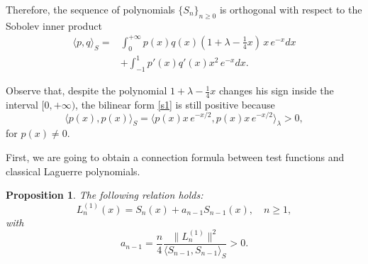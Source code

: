 \documentclass[reqno,10pt]{amsart}
\theoremstyle{plain}
\newtheorem{proposition}[theorem]{Proposition}
\numberwithin{equation}{section}
\numberwithin{figure}{section}
\begin{document}
Therefore, the sequence of polynomials $\{S_{n}\}_{n\geqslant0}$ is orthogonal with respect to the Sobolev inner product
\begin{equation}\label{s1}
\begin{aligned}
\langle p, q \rangle_S= &\int_{0}^{+\infty} p(x) q(x)  ( 1 + \lambda - \frac{1}{4} x) \, x\,e^{-x}dx
\\
& + \int_{-1}^{1} p'(x) q'(x) x^2\,e^{-x} dx.
\end{aligned}
\end{equation}

Observe that, despite the polynomial $1 + \lambda - \frac{1}{4} x$ changes his sign inside the interval $[0, +\infty)$, the bilinear form \eqref{s1} is still positive because
$$
\langle p(x), p(x) \rangle_S = \langle p(x) x\,e^{-x/2},   p(x) x\,e^{-x/2}\rangle_\lambda >0,
$$
for $p(x) \neq 0$.


\medskip

First, we are going to obtain a connection formula between test functions and classical Laguerre polynomials.


\begin{proposition}\label{connect}
The following relation holds:
\begin{equation}\label{conechat}
L_{n}^{(1)} (x)= S_{n}(x) + {a}_{n-1}S_{n-1}(x), \quad n\geqslant 1,
\end{equation}
with
\begin{equation} \label{a_n}
a_{n-1} = \frac{n}{4}\frac{\|L^{(1)}_n\|^2}{\langle S_{n-1}, S_{n-1} \rangle_S} > 0.
\end{equation}

\end{proposition}
\end{document}
